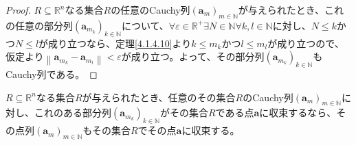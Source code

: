 \documentclass[dvipdfmx]{jsarticle}
\begin{document}
\begin{proof}
$R \subseteq \mathbb{R}^{n}$なる集合$R$の任意のCauchy列$\left( \mathbf{a}_{m} \right)_{m \in \mathbb{N}}$が与えられたとき、これの任意の部分列$\left( \mathbf{a}_{m_{k}} \right)_{k \in \mathbb{N}}$について、$\forall\varepsilon \in \mathbb{R}^{+}\exists N \in \mathbb{N}\forall k,l \in \mathbb{N}$に対し、$N \leq k$かつ$N \leq l$が成り立つなら、定理\ref{4.1.4.10}より$k \leq m_{k}$かつ$l \leq m_{l}$が成り立つので、仮定より$\left\| \mathbf{a}_{m_{k}} - \mathbf{a}_{m_{l}} \right\| < \varepsilon$が成り立つ。よって、その部分列$\left( \mathbf{a}_{m_{k}} \right)_{k \in \mathbb{N}}$もCauchy列である。
\end{proof}
\begin{thm}\label{4.1.5.4}
$R \subseteq \mathbb{R}^{n}$なる集合$R$が与えられたとき、任意のその集合$R$のCauchy列$\left( \mathbf{a}_{m} \right)_{m \in \mathbb{N}}$に対し、これのある部分列$\left( \mathbf{a}_{m_{k}} \right)_{k \in \mathbb{N}}$がその集合$R$である点$\mathbf{a}$に収束するなら、その点列$\left( \mathbf{a}_{m} \right)_{m \in \mathbb{N}}$もその集合$R$でその点$\mathbf{a}$に収束する。
\end{thm}
\end{document}
